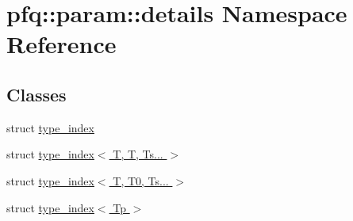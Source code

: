 \hypertarget{namespacepfq_1_1param_1_1details}{}\section{pfq\+:\+:param\+:\+:details Namespace Reference}
\label{namespacepfq_1_1param_1_1details}
\subsection*{Classes}
\begin{DoxyCompactItemize}
\item 
struct \hyperlink{structpfq_1_1param_1_1details_1_1type__index}{type\+\_\+index}
\item 
struct \hyperlink{structpfq_1_1param_1_1details_1_1type__index_3_01T_00_01T_00_01Ts_8_8_8_01_4}{type\+\_\+index$<$ T, T, Ts... $>$}
\item 
struct \hyperlink{structpfq_1_1param_1_1details_1_1type__index_3_01T_00_01T0_00_01Ts_8_8_8_01_4}{type\+\_\+index$<$ T, T0, Ts... $>$}
\item 
struct \hyperlink{structpfq_1_1param_1_1details_1_1type__index_3_01Tp_01_4}{type\+\_\+index$<$ Tp $>$}
\end{DoxyCompactItemize}
